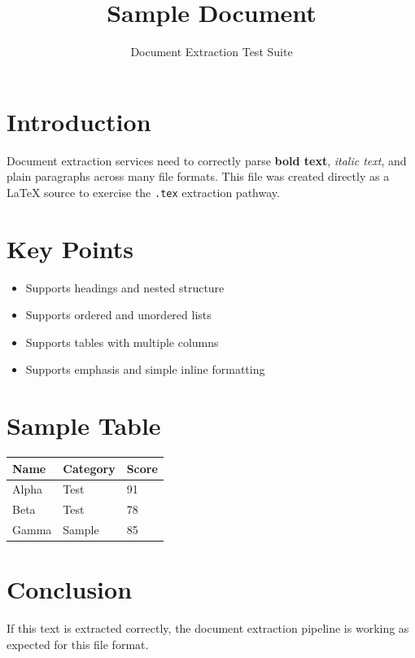 \documentclass{article}
\title{Sample Document}
\author{Document Extraction Test Suite}
\date{}
\begin{document}
\maketitle

\section{Introduction}

Document extraction services need to correctly parse \textbf{bold text},
\textit{italic text}, and plain paragraphs across many file formats. This
file was created directly as a \LaTeX{} source to exercise the
\texttt{.tex} extraction pathway.

\section{Key Points}

\begin{itemize}
  \item Supports headings and nested structure
  \item Supports ordered and unordered lists
  \item Supports tables with multiple columns
  \item Supports emphasis and simple inline formatting
\end{itemize}

\section{Sample Table}

\begin{tabular}{|l|l|l|}
\hline
Name & Category & Score \\
\hline
Alpha & Test & 91 \\
Beta & Test & 78 \\
Gamma & Sample & 85 \\
\hline
\end{tabular}

\section{Conclusion}

If this text is extracted correctly, the document extraction pipeline is
working as expected for this file format.
\end{document}
